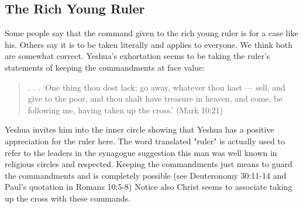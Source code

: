 \documentclass[11pt]{article}
\begin{document}
\subsection{The Rich Young Ruler}
Some people say that the command given to the rich young ruler is for a case like his. Others say it is to be taken literally and applies to everyone. We think both are somewhat correct. Yeshua's exhortation seems to be taking the ruler's statements of keeping the commandments at face value:
\begin{quote}
. . . ‘One thing thou dost lack; go away, whatever thou hast — sell, and give to the poor, and thou shalt have treasure in heaven, and come, be following me, having taken up the cross.’ (Mark 10:21) 
\end{quote}
Yeshua invites him into the inner circle showing that Yeshua has a positive appreciation for the ruler here. The word translated "ruler" is actually used to refer to the leaders in the synagogue suggestion this man was well known in religious circles and respected. Keeping the commandments just means to guard the commandments \cite{keep meaning} and is completely possible (see Deuteronomy 30:11-14 and Paul's quotation in Romans 10:5-8) 
 Notice also Christ seems to associate taking up the cross with these commands.
\end{document}
